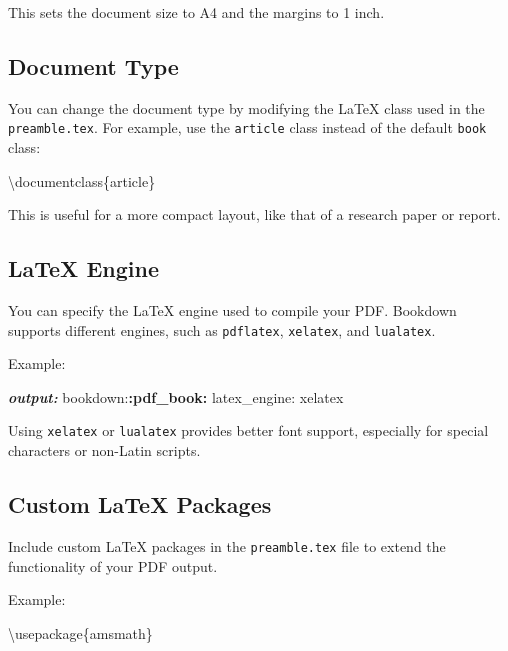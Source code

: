 \documentclass[
]{book}
\newenvironment{Shaded}{\begin{snugshade}}{\end{snugshade}}
\newcommand{\AnnotationTok}[1]{\textcolor[rgb]{0.56,0.35,0.01}{\textbf{\textit{#1}}}}
\newcommand{\BuiltInTok}[1]{#1}
\newcommand{\ExtensionTok}[1]{#1}
\newcommand{\NormalTok}[1]{#1}
\newcommand{\SpecialCharTok}[1]{\textcolor[rgb]{0.81,0.36,0.00}{\textbf{#1}}}
\theoremstyle{definition}
\theoremstyle{definition}
\theoremstyle{definition}
\theoremstyle{definition}
\theoremstyle{remark}
\begin{document}
This sets the document size to A4 and the margins to 1 inch.

\subsection{Document Type}\label{document-type}

You can change the document type by modifying the LaTeX class used in the \texttt{preamble.tex}. For example, use the \texttt{article} class instead of the default \texttt{book} class:

\begin{Shaded}
\begin{Highlighting}[]
\NormalTok{\textbackslash{}documentclass\{article\}}
\end{Highlighting}
\end{Shaded}

This is useful for a more compact layout, like that of a research paper or report.

\subsection{LaTeX Engine}\label{latex-engine}

You can specify the LaTeX engine used to compile your PDF. Bookdown supports different engines, such as \texttt{pdflatex}, \texttt{xelatex}, and \texttt{lualatex}.

Example:

\begin{Shaded}
\begin{Highlighting}[]
\AnnotationTok{output:}
\NormalTok{  bookdown:}\SpecialCharTok{:pdf\_book:}
\NormalTok{    latex\_engine: xelatex}
\end{Highlighting}
\end{Shaded}

Using \texttt{xelatex} or \texttt{lualatex} provides better font support, especially for special characters or non-Latin scripts.

\subsection{Custom LaTeX Packages}\label{custom-latex-packages}

Include custom LaTeX packages in the \texttt{preamble.tex} file to extend the functionality of your PDF output.

Example:

\begin{Shaded}
\begin{Highlighting}[]
\BuiltInTok{\textbackslash{}usepackage}\NormalTok{\{}\ExtensionTok{amsmath}\NormalTok{\}}
\end{Highlighting}
\end{Shaded}
\end{document}
